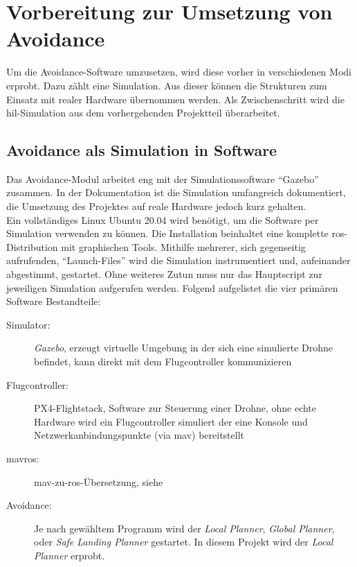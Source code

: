 \chapter{Vorbereitung zur Umsetzung von Avoidance}

Um die Avoidance-Software umzusetzen, wird diese vorher in verschiedenen Modi erprobt. Dazu zählt eine Simulation. Aus dieser können die Strukturen zum Einsatz mit realer Hardware übernommen werden. Als Zwischenschritt wird die \gls{hil}-Simulation aus dem vorhergehenden Projektteil überarbeitet.

\section{Avoidance als Simulation in Software}\label{chap:sim_gazebo}
Das Avoidance-Modul arbeitet eng mit der Simulationssoftware \enquote{Gazebo} zusammen. In der Dokumentation \cite{dronecodestiftungObstacleDetectionAvoidance2023} ist die Simulation umfangreich dokumentiert, die Umsetzung des Projektes auf reale Hardware jedoch kurz gehalten.\\
Ein vollständiges Linux Ubuntu 20.04 wird benötigt, um die Software per Simulation verwenden zu können. Die Installation beinhaltet eine komplette \acrshort{ros}-Distribution mit graphischen Tools. Mithilfe mehrerer, sich gegenseitig aufrufenden, \enquote{Launch-Files} wird die Simulation instrumentiert und, aufeinander abgestimmt, gestartet. Ohne weiteres Zutun muss nur das Hauptscript zur jeweiligen Simulation aufgerufen werden. Folgend aufgelistet die vier primären Software Bestandteile:
\begin{description}
    \item[Simulator:] \textit{Gazebo}, erzeugt virtuelle Umgebung in der sich eine simulierte Drohne befindet, kann direkt mit dem Flugcontroller kommunizieren
    \item[Flugcontroller:] PX4-Flightstack, Software zur Steuerung einer Drohne, ohne echte Hardware wird ein Flugcontroller simuliert der eine Konsole und Netzwerkanbindungspunkte (via \acrshort{mav}) bereitstellt
    \item[mavros:] \acrshort{mav}-zu-\acrshort{ros}-Übersetzung, siehe \cite[Kapitel 5.2]{markusreinErweiterungBestehenderDrohnen2023}
    \item[Avoidance:] Je nach gewähltem Programm wird der \textit{Local Planner}, \textit{Global Planner}, oder \textit{Safe Landing Planner} gestartet. In diesem Projekt wird der \textit{Local Planner} erprobt.
\end{description}
